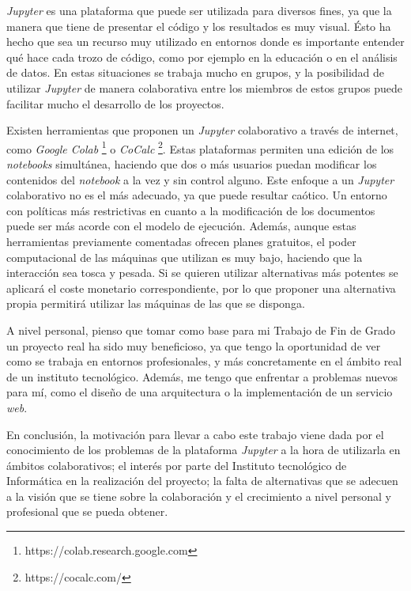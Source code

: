 \documentclass[11pt,spanish,listoffigures]{tfgetsinf}
\begin{document}
\textit{Jupyter} es una plataforma que puede ser utilizada para diversos fines, ya que la manera que tiene de presentar el código y los resultados es muy visual. Ésto ha hecho que sea un recurso muy utilizado en entornos donde es importante entender qué hace cada trozo de código, como por ejemplo en la educación o en el análisis de datos. En estas situaciones se trabaja mucho en grupos, y la posibilidad de utilizar \textit{Jupyter} de manera colaborativa entre los miembros de estos grupos puede facilitar mucho el desarrollo de los proyectos.

Existen herramientas que proponen un \textit{Jupyter} colaborativo a través de internet, como \textit{Google Colab} \footnote{https://colab.research.google.com} o \textit{CoCalc} \footnote{https://cocalc.com/}. Estas plataformas permiten una edición de los \textit{notebooks} simultánea, haciendo que dos o más usuarios puedan modificar los contenidos del \textit{notebook} a la vez y sin control alguno. Este enfoque a un \textit{Jupyter} colaborativo no es el más adecuado, ya que puede resultar caótico. Un entorno con políticas más restrictivas en cuanto a la modificación de los documentos puede ser más acorde con el modelo de ejecución. Además, aunque estas herramientas previamente comentadas ofrecen planes gratuitos, el poder computacional de las máquinas que utilizan es muy bajo, haciendo que la interacción sea tosca y pesada. Si se quieren utilizar alternativas más potentes se aplicará el coste monetario correspondiente, por lo que proponer una alternativa propia permitirá utilizar las máquinas de las que se disponga.

A nivel personal, pienso que tomar como base para mi Trabajo de Fin de Grado un proyecto real ha sido muy beneficioso, ya que tengo la oportunidad de ver como se trabaja en entornos profesionales, y más concretamente en el ámbito real de un instituto tecnológico. Además, me tengo que enfrentar a problemas nuevos para mí, como el diseño de una arquitectura o la implementación de un servicio \textit{web}. 

En conclusión, la motivación para llevar a cabo este trabajo viene dada por el conocimiento de los problemas de la plataforma \textit{Jupyter} a la hora de utilizarla en ámbitos colaborativos; el interés por parte del Instituto tecnológico de Informática en la realización del proyecto; la falta de alternativas que se adecuen a la visión que se tiene sobre la colaboración y el crecimiento a nivel personal y profesional que se pueda obtener.  
\end{document}
